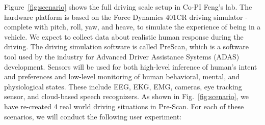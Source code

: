 Figure~\ref{fig:scenario} shows the full driving scale setup in Co-PI Feng's lab. 
The hardware platform is based on the Force Dynamics 401CR driving simulator - complete with pitch, roll, yaw, and heave, to simulate the experience of being in a vehicle. We expect to collect data about realistic human response during the driving. The driving simulation software is called PreScan, which is a software tool used by the industry for Advanced Driver Assistance Systems (ADAS) development. 
Sensors will be used for both high-level inference of human's intent and preferences and low-level monitoring of human behavioral, mental, and physiological states. These include EEG, EKG, EMG, cameras, eye tracking sensor, and cloud-based speech recognizers.
\newline
{}
As shown in Fig.~\ref{fig:scenario}, we have re-created 4 real world driving situations in Pre-Scan.
For each of these scenarios, we will conduct the following user experiment:
